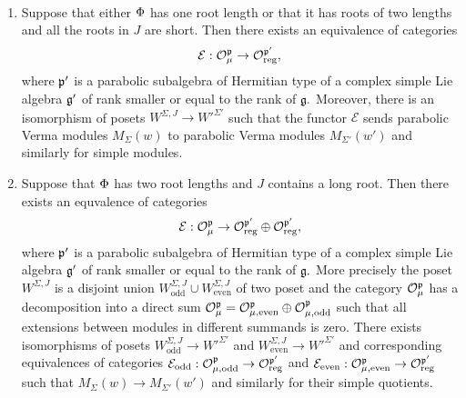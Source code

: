 \begin{theorem} 
\hspace{1em} \\[-1em]
\begin{enumerate}
	\item Suppose that either $\Phi$ has one root length or that it has roots of two lengths and all the roots in $J$ are short. Then there exists an equivalence of categories
	\[
	\mathcal{E}: \mathcal{O}^{\mathfrak{p}}_\mu \to \mathcal{O}^{\mathfrak{p'}}_{\mathrm{reg}},
	\]
	where $\mathfrak{p}'$ is a parabolic subalgebra of Hermitian type of a complex simple Lie algebra $\mathfrak{g}'$ of rank smaller or equal to the rank of $\mathfrak{g}.$ Moreover, there is an isomorphism of posets $W^{\Sigma, J} \to W'^{\Sigma'}$ such that the functor $\mathcal{E}$ sends parabolic Verma modules $M_\Sigma(w)$ to parabolic Verma modules $M_{\Sigma'} (w')$ and similarly for simple modules.
	
	\item Suppose that $\Phi$ has two root lengths and $J$ contains a long root. Then there exists an equvalence of categories
	\[
	\mathcal{E}: \mathcal{O}^{\mathfrak{p}}_\mu \to \mathcal{O}^{\mathfrak{p'}}_{\mathrm{reg}} \oplus  \mathcal{O}^{\mathfrak{p'}}_{\mathrm{reg}},
	\]
	where $\mathfrak{p}'$ is a parabolic subalgebra of Hermitian type of a complex simple Lie algebra $\mathfrak{g}'$ of rank smaller or equal to the rank of $\mathfrak{g}.$ More precisely the poset $W^{\Sigma, J}$ is a disjoint union $W^{\Sigma, J}_\mathrm{odd} \cup W^{\Sigma, J}_{\mathrm{even}}$ of two poset and the category $\mathcal{O} ^{\mathfrak{p}}_\mu$ has a decomposition into a direct sum $\mathcal{O} ^{\mathfrak{p}}_\mu = \mathcal{O} ^{\mathfrak{p}}_{\mu, \mathrm{even}} \oplus \mathcal{O} ^{\mathfrak{p}}_{\mu, \mathrm{odd}}$ such that all extensions between modules in different summands is zero. There exists isomorphisms of posets $ W^{\Sigma, J}_{\mathrm{odd}} \to W'^{\Sigma'}$ and $ W^{\Sigma, J}_{\mathrm{even}} \to W'^{\Sigma'}$ and corresponding equivalences of categories $\mathcal{E}_{\mathrm{odd}}: \mathcal{O} ^{\mathfrak{p}}_{\mu, \mathrm{odd}} \to  \mathcal{O}^{\mathfrak{p'}}_{\mathrm{reg}}$ and $\mathcal{E}_{\mathrm{even}}: \mathcal{O} ^{\mathfrak{p}}_{\mu, \mathrm{even}} \to  \mathcal{O}^{\mathfrak{p'}}_{\mathrm{reg}}$ such that $M_\Sigma(w) \to M_{\Sigma'} (w')$ and similarly for their simple quotients.
\end{enumerate}
\end{theorem}

